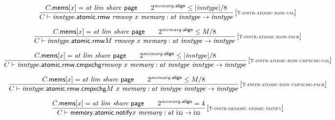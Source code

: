 $$
\begin{array}{@{}c@{}}\displaystyle
\frac{
C{.}\mathsf{mems}{}[x] = {\mathit{at}}~{\mathit{lim}}~{\mathit{share}}~\mathsf{page}
 \qquad
{2^{{\mathit{memarg}}{.}\mathsf{align}}} \leq {|{\mathit{inntype}}|} / 8
}{
C \vdash {\mathit{inntype}}{.}\mathsf{atomic}{.}\mathsf{rmw}~{\mathit{rmwop}}~x~{\mathit{memarg}} : {\mathit{at}}~{\mathit{inntype}} \rightarrow {\mathit{inntype}}
} \, {[\textsc{\scriptsize T{-}instr{-}atomic.rmw{-}val}]}
\qquad
\end{array}
$$

$$
\begin{array}{@{}c@{}}\displaystyle
\frac{
C{.}\mathsf{mems}{}[x] = {\mathit{at}}~{\mathit{lim}}~{\mathit{share}}~\mathsf{page}
 \qquad
{2^{{\mathit{memarg}}{.}\mathsf{align}}} \leq M / 8
}{
C \vdash {{\mathit{inntype}}{.}\mathsf{atomic}{.}\mathsf{rmw}}{M}~{\mathit{rmwop}}~x~{\mathit{memarg}} : {\mathit{at}}~{\mathit{inntype}} \rightarrow {\mathit{inntype}}
} \, {[\textsc{\scriptsize T{-}instr{-}atomic.rmw{-}pack}]}
\qquad
\end{array}
$$

$$
\begin{array}{@{}c@{}}\displaystyle
\frac{
C{.}\mathsf{mems}{}[x] = {\mathit{at}}~{\mathit{lim}}~{\mathit{share}}~\mathsf{page}
 \qquad
{2^{{\mathit{memarg}}{.}\mathsf{align}}} \leq {|{\mathit{inntype}}|} / 8
}{
C \vdash {{\mathit{inntype}}{.}\mathsf{atomic}{.}\mathsf{rmw}{.}\mathsf{cmpxchg}}{{\mathit{rmwop}}}~x~{\mathit{memarg}} : {\mathit{at}}~{\mathit{inntype}}~{\mathit{inntype}} \rightarrow {\mathit{inntype}}
} \, {[\textsc{\scriptsize T{-}instr{-}atomic.rmw.cmpxchg{-}val}]}
\qquad
\end{array}
$$

$$
\begin{array}{@{}c@{}}\displaystyle
\frac{
C{.}\mathsf{mems}{}[x] = {\mathit{at}}~{\mathit{lim}}~{\mathit{share}}~\mathsf{page}
 \qquad
{2^{{\mathit{memarg}}{.}\mathsf{align}}} \leq M / 8
}{
C \vdash {{\mathit{inntype}}{.}\mathsf{atomic}{.}\mathsf{rmw}{.}\mathsf{cmpxchg}}{M}~x~{\mathit{memarg}} : {\mathit{at}}~{\mathit{inntype}}~{\mathit{inntype}} \rightarrow {\mathit{inntype}}
} \, {[\textsc{\scriptsize T{-}instr{-}atomic.rmw.cmpxchg{-}pack}]}
\qquad
\end{array}
$$

$$
\begin{array}{@{}c@{}}\displaystyle
\frac{
C{.}\mathsf{mems}{}[x] = {\mathit{at}}~{\mathit{lim}}~{\mathit{share}}~\mathsf{page}
 \qquad
{2^{{\mathit{memarg}}{.}\mathsf{align}}} = 4
}{
C \vdash {\mathsf{memory{.}atomic{.}notify}}{x}~{\mathit{memarg}} : {\mathit{at}}~\mathsf{i{\scriptstyle 32}} \rightarrow \mathsf{i{\scriptstyle 32}}
} \, {[\textsc{\scriptsize T{-}instr{-}memory.atomic.notify}]}
\qquad
\end{array}
$$

